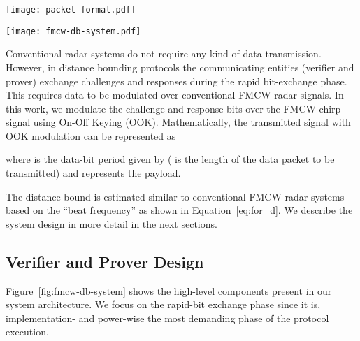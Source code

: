 \documentclass{sig-alternate-10pt}
\begin{document}
\begin{figure*}[t]
  \centering
  \texttt{[image: packet-format.pdf]}
  \caption{OOK-FMCW packet format: An example OOK-FMCW packet as transmitted by
    the verifier and the corresponding reflected signal from the prover. The
    shown signals are for challenge bits  and the prover's
    processing function is a simple ``invert'' operation. The verifier and
    prover synchronize to these slots using a preamble (not shown in figure).}
  \label{fig:packet-format}
\end{figure*}
\begin{figure*}[t]
  \centering
  \texttt{[image: fmcw-db-system.pdf]}
  \caption{OOK-FMCW based distance bounding system architecture: The
    interrogating signal  is an OOK-FMCW transmitted by the verifier.
    The prover receives, demodulates the challenge and computes the response
    while simultaneously reflecting the challenge signal back to the verifier.
    The responses are OOK modulated in the corresponding response time slot. The
    received signal at the verifier is then processed for both range estimation
    and verification of the prover's response.}
  \label{fig:fmcw-db-system}
\end{figure*}


Conventional radar systems do not require any kind of data transmission.
However, in distance bounding protocols the communicating entities (verifier and
prover) exchange challenges and responses during the rapid bit-exchange phase.
This requires data to be modulated over conventional FMCW radar signals. In this
work, we modulate the challenge and response bits over the FMCW chirp signal
using On-Off Keying (OOK). Mathematically, the transmitted signal with OOK
modulation can be represented as



where  is the data-bit period given by  ( is the length
of the data packet to be transmitted) and  represents the payload.

The distance bound is estimated similar to conventional FMCW radar systems based
on the ``beat frequency''  as shown in Equation~\eqref{eq:for_d}. We
describe the system design in more detail in the next sections.


\subsection{Verifier and Prover Design}
\label{subssec:sys-design}
Figure~\ref{fig:fmcw-db-system} shows the high-level components present in our
system architecture. We focus on the rapid-bit exchange phase since it is,
implementation- and power-wise the most demanding phase of the protocol
execution.
\end{document}
